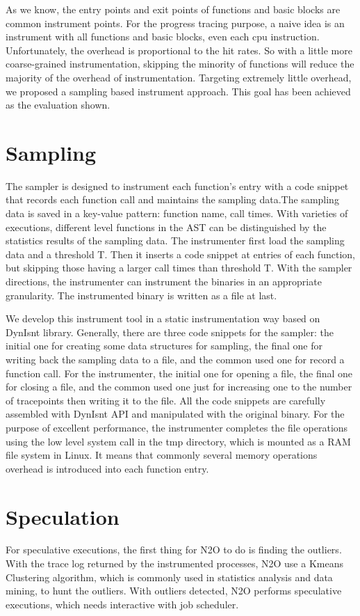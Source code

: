 As we know, the entry points and exit points of functions and basic blocks are common instrument points. For the progress tracing purpose, a naive idea is an instrument with all functions and basic blocks, even each cpu instruction. Unfortunately, the overhead is proportional to the hit rates. So with a little more coarse-grained instrumentation, skipping the minority of functions will reduce the majority of the overhead of instrumentation. Targeting extremely little overhead, we proposed a sampling based instrument approach. This goal has been achieved as the evaluation shown.

\section{Sampling}

The sampler is designed to instrument each function’s entry with a code snippet that records each function call and maintains the sampling data.The sampling data is saved in a key-value pattern: function name, call times. With varieties of executions, different level functions in the AST can be distinguished by the statistics results of the sampling data. The instrumenter first load the sampling data and a threshold T. Then it inserts a code snippet at entries of each function, but skipping those having a larger call times than threshold T. With the sampler directions, the instrumenter can instrument the binaries in an appropriate granularity. The instrumented binary is written as a file at last. 

We develop this instrument tool in a static instrumentation way based on DynIsnt library. Generally, there are three code snippets for the sampler: the initial one for creating some data structures for sampling, the final one for writing back the sampling data to a file, and the common used one for record a function call. For the instrumenter, the initial one for opening a file, the final one for closing a file, and the common used one just for increasing one to the number of tracepoints then writing it to the file. All the code snippets are carefully assembled with DynIsnt API and manipulated with the original binary. For the purpose of excellent performance, the instrumenter completes the file operations using the low level system call in the tmp directory, which is mounted as a RAM file system in Linux. It means that commonly several memory operations overhead is introduced into each function entry.

\section{Speculation}
For speculative executions, the first thing for N2O to do is finding the outliers. With the trace log returned by the instrumented processes, N2O use a Kmeans Clustering algorithm, which is commonly used in statistics analysis and data mining, to hunt the outliers. With outliers detected, N2O performs speculative executions, which needs interactive with job scheduler. 

